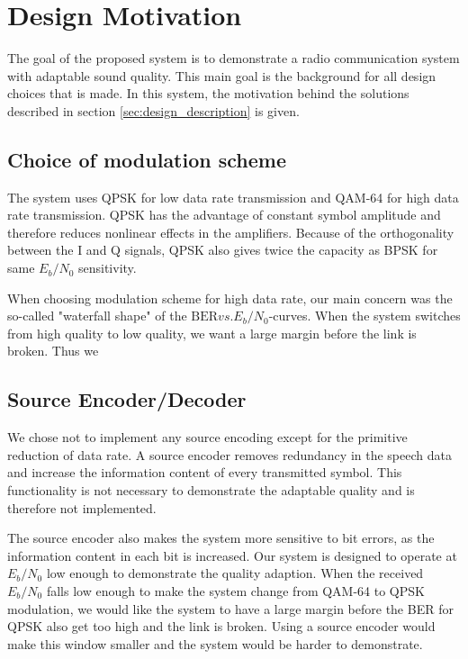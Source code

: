 \section{Design Motivation}
\label{sec:design_motivation}
The goal of the proposed system is to demonstrate a radio communication system with adaptable sound quality. This main goal is the background for all design choices that is made. In this system, the motivation behind the solutions described in section \ref{sec:design_description} is given.

\subsection{Choice of modulation scheme}
The system uses QPSK for low data rate transmission and QAM-64 for high data rate transmission. QPSK has the advantage of constant symbol amplitude and therefore reduces nonlinear effects in the amplifiers. Because of the orthogonality between the I and Q signals, QPSK also gives twice the capacity as BPSK for same $E_b/N_0$ sensitivity. 

When choosing modulation scheme for high data rate, our main concern was the so-called "waterfall shape" of the $\text{BER}
vs. E_b/N_0$-curves. When the system switches from high quality to low quality, we want a large margin before the link is broken. Thus we 


\subsection{Source Encoder/Decoder}
We chose not to implement any source encoding except for the primitive reduction of data rate. A source encoder removes redundancy in the speech data and increase the information content of every transmitted symbol. This functionality is not necessary to demonstrate the adaptable quality and is therefore not implemented. 

The source encoder also makes the system more sensitive to bit errors, as the information content in each bit is increased. Our system is designed to operate at $E_b / N_0$ low enough to demonstrate the quality adaption. When the received $E_b / N_0$ falls low enough to make the system change from QAM-64 to QPSK modulation, we would like the system to have a large margin before the BER for QPSK also get too high and the link is broken. Using a source encoder would make this window smaller and the system would be harder to demonstrate. 

